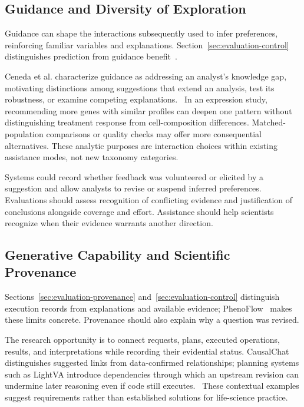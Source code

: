 \subsection{Guidance and Diversity of Exploration}
\label{sec:challenges-guidance}
Guidance can shape the interactions subsequently used to infer preferences, reinforcing familiar variables and explanations. Section~\ref{sec:evaluation-control} distinguishes prediction from guidance benefit~\cite{EvalHa2023}.

Ceneda et al. characterize guidance as addressing an analyst's knowledge gap, motivating distinctions among suggestions that extend an analysis, test its robustness, or examine competing explanations.~\cite{Ceneda2017Guidance} In an expression study, recommending more genes with similar profiles can deepen one pattern without distinguishing treatment response from cell-composition differences. Matched-population comparisons or quality checks may offer more consequential alternatives. These analytic purposes are interaction choices within existing assistance modes, not new taxonomy categories.

Systems could record whether feedback was volunteered or elicited by a suggestion and allow analysts to revise or suspend inferred preferences. Evaluations should assess recognition of conflicting evidence and justification of conclusions alongside coverage and effort. Assistance should help scientists recognize when their evidence warrants another direction.

\subsection{Generative Capability and Scientific Provenance}
\label{sec:challenges-generative}
Sections~\ref{sec:evaluation-provenance} and~\ref{sec:evaluation-control} distinguish execution records from explanations and available evidence; PhenoFlow~\cite{EvalKim2025} makes these limits concrete. Provenance should also explain why a question was revised.

The research opportunity is to connect requests, plans, executed operations, results, and interpretations while recording their evidential status. CausalChat distinguishes suggested links from data-confirmed relationships; planning systems such as LightVA introduce dependencies through which an upstream revision can undermine later reasoning even if code still executes.~\cite{CausalChat,LightVA} These contextual examples suggest requirements rather than established solutions for life-science practice.

